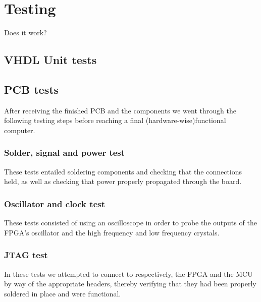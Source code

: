 \chapter{Testing}

Does it work?

\section{VHDL Unit tests}




\section{PCB tests}

After receiving the finished PCB and the components we went through the following testing steps before reaching a final (hardware-wise)functional computer.   

\subsection{Solder, signal and power test}
These tests entailed soldering components and checking that the connections held, as well as checking that power properly propagated through the board.  


\subsection{Oscillator and clock test}
These tests consisted of using an oscilloscope in order to probe the outputs of the FPGA's oscillator and the high frequency and low frequency crystals.


\subsection{JTAG test}
In these tests we attempted to connect to respectively, the FPGA and the MCU by way of the appropriate headers, thereby verifying that they had been properly soldered in place and were functional.

